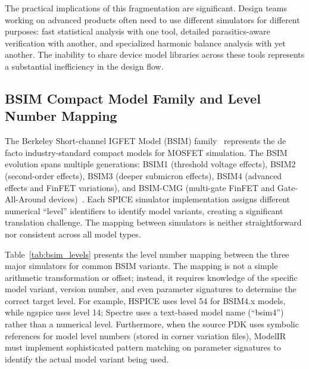 \documentclass[10pt,twocolumn]{article}
\begin{document}
The practical implications of this fragmentation are significant. Design teams working on advanced products often need to use different simulators for different purposes: fast statistical analysis with one tool, detailed parasitics-aware verification with another, and specialized harmonic balance analysis with yet another. The inability to share device model libraries across these tools represents a substantial inefficiency in the design flow.

\subsection{BSIM Compact Model Family and Level Number Mapping}

The Berkeley Short-channel IGFET Model (BSIM) family~\cite{bsim3_ref, bsim4, bsim_coremodel, bsim_history} represents the de facto industry-standard compact models for MOSFET simulation. The BSIM evolution spans multiple generations: BSIM1 (threshold voltage effects), BSIM2 (second-order effects), BSIM3 (deeper submicron effects), BSIM4 (advanced effects and FinFET variations), and BSIM-CMG (multi-gate FinFET and Gate-All-Around devices)~\cite{bsim_cmg, bsim_soi}. Each SPICE simulator implementation assigns different numerical ``level'' identifiers to identify model variants, creating a significant translation challenge. The mapping between simulators is neither straightforward nor consistent across all model types.

Table~\ref{tab:bsim_levels} presents the level number mapping between the three major simulators for common BSIM variants. The mapping is not a simple arithmetic transformation or offset; instead, it requires knowledge of the specific model variant, version number, and even parameter signatures to determine the correct target level. For example, HSPICE uses level 54 for BSIM4.x models, while ngspice uses level 14; Spectre uses a text-based model name (``bsim4'') rather than a numerical level. Furthermore, when the source PDK uses symbolic references for model level numbers (stored in corner variation files), ModelIR must implement sophisticated pattern matching on parameter signatures to identify the actual model variant being used.
\end{document}
